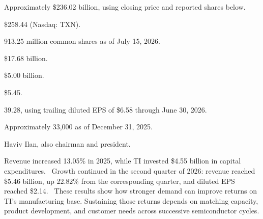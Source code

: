 \documentclass[10pt]{article}
\begin{document}
\begin{description}[style = unboxed, leftmargin = 0pt, labelwidth = 0pt, itemsep = 0pt, parsep = 0pt, topsep = 0.3em]
    \item[Market capitalization:] Approximately \$236.02 billion, using closing price and reported shares below.
    \item[Share price:] \$258.44 (Nasdaq: TXN).~\cite{ti-price}
    \item[Shares outstanding:] 913.25 million common shares as of July 15, 2026.~\cite{ti-quarterly}
    \item[Annual revenue:] \$17.68 billion.~\cite{ti-annual}
    \item[Annual net income:] \$5.00 billion.~\cite{ti-annual}
    \item[Annual diluted earnings per share:] \$5.45.~\cite{ti-annual}
    \item[Price-to-earnings ratio:] 39.28, using trailing diluted EPS of \$6.58 through June 30, 2026.~\cite{ti-annual,ti-quarterly}
    \item[Employees:] Approximately 33,000 as of December 31, 2025.~\cite{ti-annual}
    \item[CEO:] Haviv Ilan, also chairman and president.~\cite{ti-acquisition}
\end{description}

Revenue increased 13.05\% in 2025, while TI invested \$4.55 billion in capital expenditures.~\cite{ti-annual} Growth continued in the second quarter of 2026: revenue reached \$5.46 billion, up 22.82\% from the corresponding quarter, and diluted EPS reached \$2.14.~\cite{ti-quarterly} These results show how stronger demand can improve returns on TI's manufacturing base. Sustaining those returns depends on matching capacity, product development, and customer needs across successive semiconductor cycles.
\end{document}

